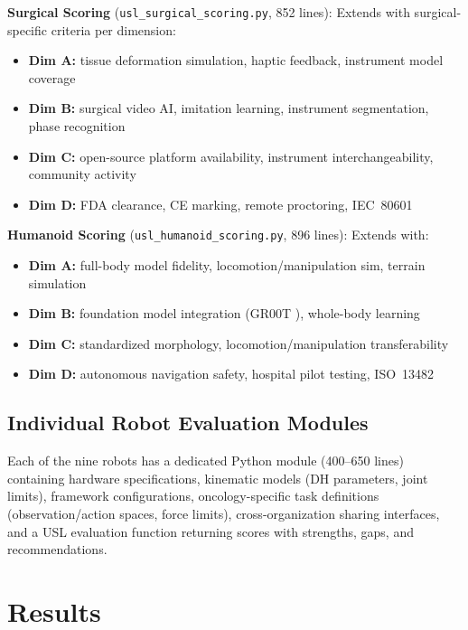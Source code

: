 \documentclass[11pt,a4paper]{article}
\begin{document}
\textbf{Surgical Scoring} (\texttt{usl\_surgical\_scoring.py}, 852 lines): Extends with surgical-specific criteria per dimension:
\begin{itemize}
  \item \textbf{Dim A:} tissue deformation simulation, haptic feedback, instrument model coverage
  \item \textbf{Dim B:} surgical video AI, imitation learning, instrument segmentation, phase recognition
  \item \textbf{Dim C:} open-source platform availability, instrument interchangeability, community activity
  \item \textbf{Dim D:} FDA clearance, CE marking, remote proctoring, IEC~80601 \cite{iec80601}
\end{itemize}

\textbf{Humanoid Scoring} (\texttt{usl\_humanoid\_scoring.py}, 896 lines): Extends with:
\begin{itemize}
  \item \textbf{Dim A:} full-body model fidelity, locomotion/manipulation sim, terrain simulation
  \item \textbf{Dim B:} foundation model integration (GR00T \cite{groot2026}), whole-body learning
  \item \textbf{Dim C:} standardized morphology, locomotion/manipulation transferability
  \item \textbf{Dim D:} autonomous navigation safety, hospital pilot testing, ISO~13482 \cite{iso13482}
\end{itemize}

\subsection{Individual Robot Evaluation Modules}
Each of the nine robots has a dedicated Python module (400--650 lines) containing hardware specifications, kinematic models (DH parameters, joint limits), framework configurations, oncology-specific task definitions (observation/action spaces, force limits), cross-organization sharing interfaces, and a USL evaluation function returning scores with strengths, gaps, and recommendations.

\section{Results}
\label{sec:results}
\end{document}
